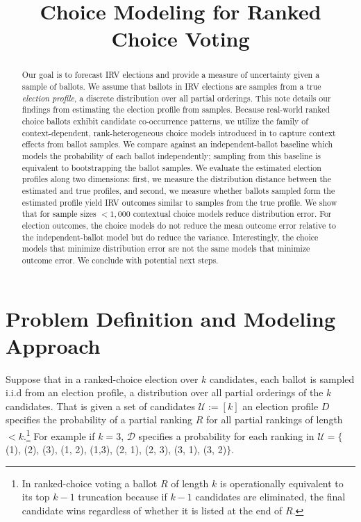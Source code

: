 \documentclass{article}
\title{Choice Modeling for Ranked Choice Voting}
\author{
}
\begin{document}
\maketitle

\begin{abstract}
Our goal is to forecast IRV elections and provide a measure of uncertainty given a sample of ballots. We assume that ballots in IRV elections are samples from a true \emph{election profile}, a discrete distribution over all partial orderings. This note details our findings from estimating the election profile from samples. Because real-world ranked choice ballots exhibit candidate co-occurrence patterns, we utilize the family of context-dependent, rank-heterogeneous choice models introduced in \citet{rank2023awadelkarim} to capture context effects from ballot samples. We compare against an independent-ballot baseline which models the probability of each ballot independently; sampling from this baseline is equivalent to bootstrapping the ballot samples. We evaluate the estimated election profiles along two dimensions: first, we measure the distribution distance between the estimated and true profiles, and second, we measure whether ballots sampled form the estimated profile yield IRV outcomes similar to samples from the true profile. We show that for sample sizes $<1,000$ contextual choice models reduce distribution error. For election outcomes, the choice models do not reduce the mean outcome error relative to the independent-ballot model but do reduce the variance. Interestingly, the choice models that minimize distribution error are not the same models that minimize outcome error. We conclude with potential next steps.
\end{abstract}

\section{Problem Definition and Modeling Approach}

Suppose that in a ranked-choice election over $k$ candidates, each ballot is sampled i.i.d from an election profile, a distribution over all partial orderings of the $k$ candidates.
%
That is given a set of candidates $\mathcal{U} := [k]$ an election profile $D$ specifies the probability of a partial ranking $R$ for all partial rankings of length $< k$.\footnote{In ranked-choice voting a ballot $R$ of length $k$ is operationally equivalent to its top $k-1$ truncation because if $k-1$ candidates are eliminated, the final candidate wins regardless of whether it is listed at the end of $R$.}
%
For example if $k=3$, $\mathcal{D}$ specifies a probability for each ranking in $\mathcal{U} = \{$(1), (2), (3), (1, 2), (1,3), (2, 1), (2, 3), (3, 1), (3, 2)$\}$.
\end{document}
